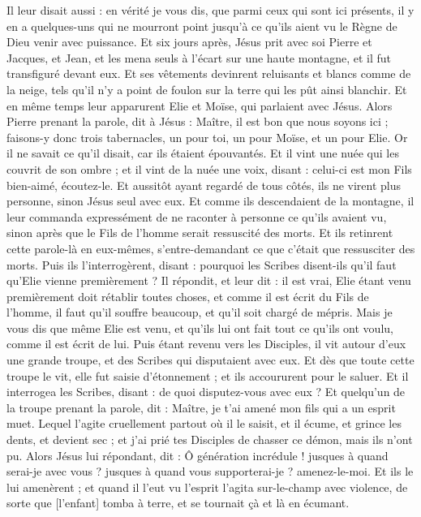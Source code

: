 \begin{multicols}{2}
\VerseOne{}Il leur disait aussi : en vérité je vous dis, que parmi ceux qui sont ici présents, il y en a quelques-uns qui ne mourront point jusqu'à ce qu’ils aient vu le Règne de Dieu venir avec puissance.
Et six jours après, Jésus prit avec soi Pierre et Jacques, et Jean, et les mena seuls à l'écart sur une haute montagne, et il fut transfiguré devant eux.
Et ses vêtements devinrent reluisants et blancs comme de la neige, tels qu'il n'y a point de foulon sur la terre qui les pût ainsi blanchir.
Et en même temps leur apparurent Elie et Moïse, qui parlaient avec Jésus.
Alors Pierre prenant la parole, dit à Jésus : Maître, il est bon que nous soyons ici ; faisons-y donc trois tabernacles, un pour toi, un pour Moïse, et un pour Elie.
Or il ne savait ce qu'il disait, car ils étaient épouvantés.
Et il vint une nuée qui les couvrit de son ombre ; et il vint de la nuée une voix, disant : celui-ci est mon Fils bien-aimé, écoutez-le.
Et aussitôt ayant regardé de tous côtés, ils ne virent plus personne, sinon Jésus seul avec eux.
Et comme ils descendaient de la montagne, il leur commanda expressément de ne raconter à personne ce qu'ils avaient vu, sinon après que le Fils de l'homme serait ressuscité des morts.
Et ils retinrent cette parole-là en eux-mêmes, s'entre-demandant ce que c'était que ressusciter des morts.
Puis ils l'interrogèrent, disant : pourquoi les Scribes disent-ils qu'il faut qu'Elie vienne premièrement ?
Il répondit, et leur dit : il est vrai, Elie étant venu premièrement doit rétablir toutes choses, et comme il est écrit du Fils de l'homme, il faut qu'il souffre beaucoup, et qu'il soit chargé de mépris.
Mais je vous dis que même Elie est venu, et qu'ils lui ont fait tout ce qu'ils ont voulu, comme il est écrit de lui.
Puis étant revenu vers les Disciples, il vit autour d'eux une grande troupe, et des Scribes qui disputaient avec eux.
Et dès que toute cette troupe le vit, elle fut saisie d'étonnement ; et ils accoururent pour le saluer.
Et il interrogea les Scribes, disant : de quoi disputez-vous avec eux ?
Et quelqu'un de la troupe prenant la parole, dit : Maître, je t'ai amené mon fils qui a un esprit muet.
Lequel l'agite cruellement partout où il le saisit, et il écume, et grince les dents, et devient sec ; et j'ai prié tes Disciples de chasser ce démon, mais ils n'ont pu.
Alors Jésus lui répondant, dit : Ô génération incrédule ! jusques à quand serai-je avec vous ? jusques à quand vous supporterai-je ? amenez-le-moi.
Et ils le lui amenèrent ; et quand il l'eut vu l'esprit l'agita sur-le-champ avec violence, de sorte que [l'enfant] tomba à terre, et se tournait çà et là en écumant.

\end{multicols}
